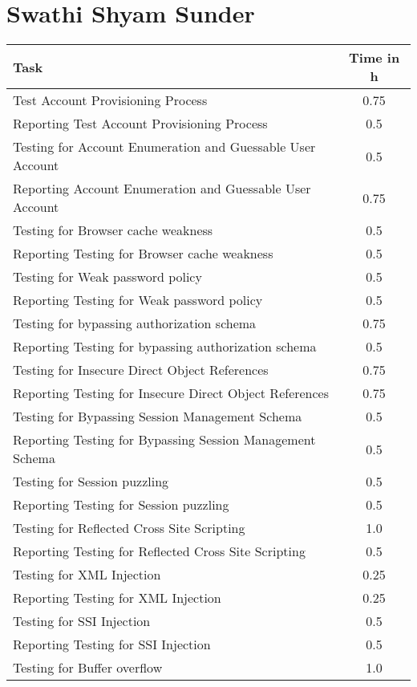 \section{Swathi Shyam Sunder}
\begin{table}[H]
\tiny
\begin{tabular*}{\textwidth}{@{\extracolsep{\fill}} l c@{\extracolsep{0pt}} }
\textbf{Task} & \textbf{Time in h} \\ \hline
Test Account Provisioning Process 		    & 0.75 \\
Reporting Test Account Provisioning Process	& 0.5 \\
Testing for Account Enumeration and Guessable User Account & 0.5 \\
Reporting Account Enumeration and Guessable User Account & 0.75 \\
Testing for Browser cache weakness 			& 0.5 \\
Reporting Testing for Browser cache weakness & 0.5 \\
Testing for Weak password policy 		    & 0.5 \\
Reporting Testing for Weak password policy  & 0.5 \\
Testing for bypassing authorization schema  & 0.75 \\
Reporting Testing for bypassing authorization schema & 0.5 \\
Testing for Insecure Direct Object References & 0.75 \\
Reporting Testing for Insecure Direct Object References & 0.75 \\
Testing for Bypassing Session Management Schema	& 0.5 \\
Reporting Testing for Bypassing Session Management Schema & 0.5 \\
Testing for Session puzzling		        & 0.5 \\
Reporting Testing for Session puzzling		& 0.5 \\
Testing for Reflected Cross Site Scripting	& 1.0 \\
Reporting Testing for Reflected Cross Site Scripting & 0.5 \\
Testing for XML Injection					& 0.25 \\
Reporting Testing for XML Injection 		& 0.25 \\
Testing for SSI Injection					& 0.5 \\
Reporting Testing for SSI Injection 		& 0.5 \\
Testing for Buffer overflow		            & 1.0 \\

\end{tabular*}
\end{table}
